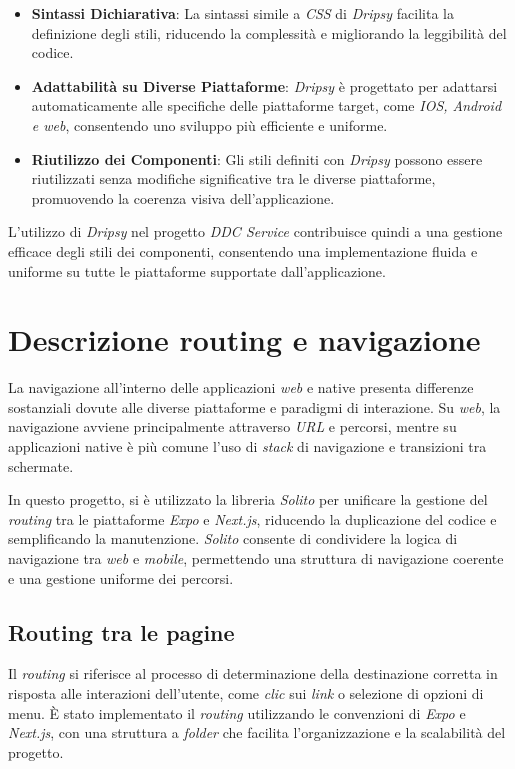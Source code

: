 \begin{itemize}
    \item \textbf{Sintassi Dichiarativa}: La sintassi simile a \textit{CSS} di \textit{Dripsy} facilita la definizione degli stili, 
    riducendo la complessità e migliorando la leggibilità del codice.
    \item \textbf{Adattabilità su Diverse Piattaforme}: \textit{Dripsy} è progettato per adattarsi automaticamente alle specifiche delle piattaforme target, 
    come \textit{IOS, Android e web}, consentendo uno sviluppo più efficiente e uniforme.
    \item \textbf{Riutilizzo dei Componenti}: Gli stili definiti con \textit{Dripsy} possono essere riutilizzati senza modifiche significative tra le diverse piattaforme, 
    promuovendo la coerenza visiva dell'applicazione.
\end{itemize}

L'utilizzo di \textit{Dripsy} nel progetto \textit{DDC Service} contribuisce quindi a una gestione efficace degli stili dei componenti, 
consentendo una implementazione fluida e uniforme su tutte le piattaforme supportate dall'applicazione.

\section{Descrizione routing e navigazione}
La navigazione all'interno delle applicazioni \textit{web} e native presenta differenze sostanziali dovute alle diverse piattaforme e paradigmi di interazione. 
Su \textit{web}, la navigazione avviene principalmente attraverso \textit{URL} e percorsi, mentre su applicazioni native è più comune l'uso di \textit{stack} di navigazione e transizioni tra schermate.

In questo progetto, si è utilizzato la libreria \textit{Solito} per unificare la gestione del \textit{routing} tra le piattaforme \textit{Expo} e \textit{Next.js}, riducendo la duplicazione del codice e semplificando la manutenzione. 
\textit{Solito} consente di condividere la logica di navigazione tra \textit{web} e \textit{mobile}, permettendo una struttura di navigazione coerente e una gestione uniforme dei percorsi.

\subsection*{Routing tra le pagine}
Il \textit{routing} si riferisce al processo di determinazione della destinazione corretta in risposta alle interazioni dell'utente, come \textit{clic} sui \textit{link} o selezione di opzioni di menu.
È stato implementato il \textit{routing} utilizzando le convenzioni di \textit{Expo} e \textit{Next.js}, con una struttura a \textit{folder} che facilita l'organizzazione e la scalabilità del progetto.

